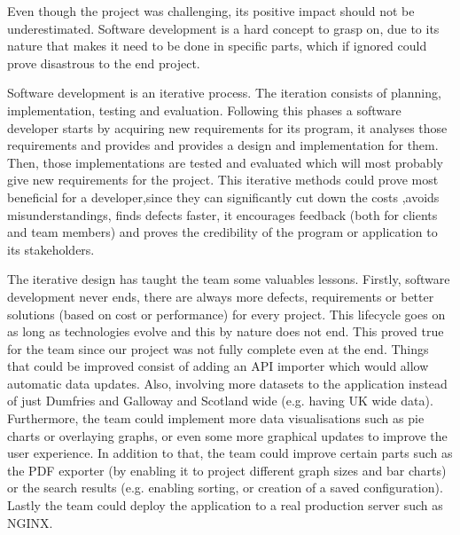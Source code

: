 \documentclass{l3proj}
\begin{document}
Even though the project was challenging, its positive impact should not be underestimated. Software development is a hard concept to grasp on, due to its nature that makes it need to be done in specific parts, which if ignored could prove disastrous to the end project.

Software development is an iterative process. The iteration consists of planning, implementation, testing and evaluation. Following this phases a software developer  starts by acquiring new requirements for its program, it analyses those requirements and provides and provides a design and implementation for them. Then, those implementations are tested and evaluated which will most probably give new requirements for the project. This iterative methods could prove most beneficial for a developer,since they can significantly cut down the costs ,avoids misunderstandings, finds defects faster, it encourages feedback (both for clients and team members) and proves the credibility of the program or application to its stakeholders.

The iterative design has taught the team some valuables lessons. Firstly, software development never ends, there are always more defects, requirements or better solutions (based on cost or performance) for every project. This lifecycle goes on as long as technologies evolve and this by nature does not end. This proved true for the team since our project was not fully complete even at the end. Things that could be improved consist of adding an API importer which would allow automatic data updates. Also, involving more datasets to the application instead of just Dumfries and Galloway and Scotland wide (e.g. having UK wide data). Furthermore, the team could implement more data visualisations such as pie charts or overlaying graphs, or even some more graphical updates to improve the user experience. In addition to that, the team could improve certain parts such as the PDF exporter (by enabling it to project different graph sizes and bar charts) or the search results (e.g. enabling sorting, or creation of a saved configuration). Lastly the team could deploy the application to a real production server such as NGINX.



\end{document}
